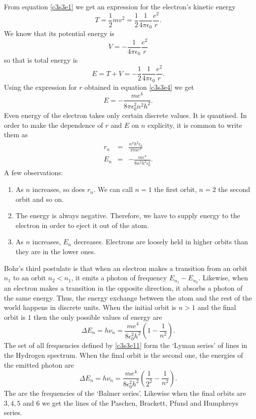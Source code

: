 From equation \eqref{c3s3e1} we get an expression for the electron's kinetic
energy
\begin{equation}\label{c3s3e5}
T = \frac{1}{2}mv^2 = \frac{1}{2}\frac{1}{4\pi\epsilon_0}\frac{e^2}{r}.
\end{equation}
We know that its potential energy is
\begin{equation}\label{c3s3e6}
V = -\frac{1}{4\pi\epsilon_0}\frac{e^2}{r}
\end{equation}
so that is total energy is
\begin{equation}\label{c3s3e7}
E = T + V = -\frac{1}{2}\frac{1}{4\pi\epsilon_0}\frac{e^2}{r}.
\end{equation}
Using the expression for $r$ obtained in equation \eqref{c3s3e4} we get
\begin{equation}\label{c3s3e8}
E = -\frac{me^4}{8\pi\epsilon_0^2 n^2h^2}.
\end{equation}
Even energy of the electron takes only certain discrete values. It is quantised.
In order to make the dependence of $r$ and $E$ on $n$ explicity, it is common to
write them as
\begin{eqnarray}
r_n &=& \frac{n^2 h^2 \epsilon_0}{\pi me^2} \label{c3s3e9} \\
E_n &=& -\frac{me^4}{8 n^2h^2\epsilon_0^2}. \label{c3s3e10}
\end{eqnarray}
A few observations:
\begin{enumerate}
\item As $n$ increases, so does $r_n$. We can call $n = 1$ the first orbit, 
$n = 2$ the second orbit and so on.
\item The energy is always negative. Therefore, we have to supply energy to the
electron in order to eject it out of the atom.
\item As $n$ increases, $E_n$ decreases. Electrons are loosely held in higher 
orbits than they are in the lower ones.
\end{enumerate}
Bohr's third postulate is that when an electron makes a transition from an orbit
$n_1$ to an orbit $n_2 < n_1$, it emits a photon of frequency $E_{n_1}-E_{n_2}$.
Likewise, when an electron makes a transition in the opposite direction, it 
absorbs a photon of the same energy. Thus, the energy exchange between the atom
and the rest of the world happens in discrete units. When the initial orbit is
$n > 1$ and the final orbit is $1$ then the only possible values of energy are
\begin{equation}\label{c3s3e11}
\Delta E_n=h\nu_n =\frac{me^4}{8\epsilon_0^2h^2}\left(1 - \frac{1}{n^2}\right).
\end{equation}
The set of all frequencies defined by \eqref{c3s3e11} form the `Lyman series' of
lines in the Hydrogen spectrum. When the final orbit is the second one, the 
energies of the emitted photon are
\begin{equation}\label{c3s3e11}
\Delta E_n = h\nu_n =
\frac{me^4}{8\epsilon_0^2h^2}\left(\frac{1}{2^2} - \frac{1}{n^2}\right).
\end{equation}
The are the frequencies of the `Balmer series'. Likewise when the final orbits 
are $3, 4, 5$ and $6$ we get the lines of the Paschen, Brackett, Pfund and 
Humphreys series.

